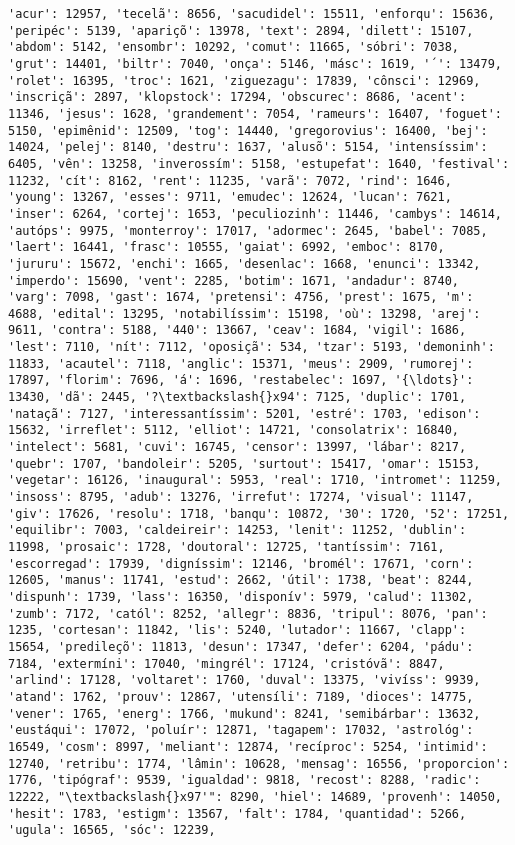 \begin{Verbatim}[commandchars=\\\{\}]
'acur': 12957, 'tecelã': 8656, 'sacudidel': 15511, 'enforqu': 15636, 'peripéc': 5139, 'apariçõ': 13978, 'text': 2894, 'dilett': 15107, 'abdom': 5142, 'ensombr': 10292, 'comut': 11665, 'sóbri': 7038, 'grut': 14401, 'biltr': 7040, 'onça': 5146, 'másc': 1619, '´': 13479, 'rolet': 16395, 'troc': 1621, 'ziguezagu': 17839, 'cônsci': 12969, 'inscriçã': 2897, 'klopstock': 17294, 'obscurec': 8686, 'acent': 11346, 'jesus': 1628, 'grandement': 7054, 'rameurs': 16407, 'foguet': 5150, 'epimênid': 12509, 'tog': 14440, 'gregorovius': 16400, 'bej': 14024, 'pelej': 8140, 'destru': 1637, 'alusõ': 5154, 'intensíssim': 6405, 'vên': 13258, 'inverossím': 5158, 'estupefat': 1640, 'festival': 11232, 'cít': 8162, 'rent': 11235, 'varã': 7072, 'rind': 1646, 'young': 13267, 'esses': 9711, 'emudec': 12624, 'lucan': 7621, 'inser': 6264, 'cortej': 1653, 'peculiozinh': 11446, 'cambys': 14614, 'autóps': 9975, 'monterroy': 17017, 'adormec': 2645, 'babel': 7085, 'laert': 16441, 'frasc': 10555, 'gaiat': 6992, 'emboc': 8170, 'jururu': 15672, 'enchi': 1665, 'desenlac': 1668, 'enunci': 13342, 'imperdo': 15690, 'vent': 2285, 'botim': 1671, 'andadur': 8740, 'varg': 7098, 'gast': 1674, 'pretensi': 4756, 'prest': 1675, 'm': 4688, 'edital': 13295, 'notabilíssim': 15198, 'où': 13298, 'arej': 9611, 'contra': 5188, '440': 13667, 'ceav': 1684, 'vigil': 1686, 'lest': 7110, 'nít': 7112, 'oposiçã': 534, 'tzar': 5193, 'demoninh': 11833, 'acautel': 7118, 'anglic': 15371, 'meus': 2909, 'rumorej': 17897, 'florim': 7696, 'á': 1696, 'restabelec': 1697, '{\ldots}': 13430, 'dã': 2445, '?\textbackslash{}x94': 7125, 'duplic': 1701, 'nataçã': 7127, 'interessantíssim': 5201, 'estré': 1703, 'edison': 15632, 'irreflet': 5112, 'elliot': 14721, 'consolatrix': 16840, 'intelect': 5681, 'cuvi': 16745, 'censor': 13997, 'lábar': 8217, 'quebr': 1707, 'bandoleir': 5205, 'surtout': 15417, 'omar': 15153, 'vegetar': 16126, 'inaugural': 5953, 'real': 1710, 'intromet': 11259, 'insoss': 8795, 'adub': 13276, 'irrefut': 17274, 'visual': 11147, 'giv': 17626, 'resolu': 1718, 'banqu': 10872, '30': 1720, '52': 17251, 'equilibr': 7003, 'caldeireir': 14253, 'lenit': 11252, 'dublin': 11998, 'prosaic': 1728, 'doutoral': 12725, 'tantíssim': 7161, 'escorregad': 17939, 'digníssim': 12146, 'bromél': 17671, 'corn': 12605, 'manus': 11741, 'estud': 2662, 'útil': 1738, 'beat': 8244, 'dispunh': 1739, 'lass': 16350, 'disponív': 5979, 'calud': 11302, 'zumb': 7172, 'catól': 8252, 'allegr': 8836, 'tripul': 8076, 'pan': 1235, 'cortesan': 11842, 'lis': 5240, 'lutador': 11667, 'clapp': 15654, 'predileçõ': 11813, 'desun': 17347, 'defer': 6204, 'pádu': 7184, 'extermíni': 17040, 'mingrél': 17124, 'cristóvã': 8847, 'arlind': 17128, 'voltaret': 1760, 'duval': 13375, 'vivíss': 9939, 'atand': 1762, 'prouv': 12867, 'utensíli': 7189, 'dioces': 14775, 'vener': 1765, 'energ': 1766, 'mukund': 8241, 'semibárbar': 13632, 'eustáqui': 17072, 'poluír': 12871, 'tagapem': 17032, 'astrológ': 16549, 'cosm': 8997, 'meliant': 12874, 'recíproc': 5254, 'intimid': 12740, 'retribu': 1774, 'lâmin': 10628, 'mensag': 16556, 'proporcion': 1776, 'tipógraf': 9539, 'igualdad': 9818, 'recost': 8288, 'radic': 12222, "\textbackslash{}x97'": 8290, 'hiel': 14689, 'provenh': 14050, 'hesit': 1783, 'estigm': 13567, 'falt': 1784, 'quantidad': 5266, 'ugula': 16565, 'sóc': 12239, 
\end{Verbatim}
